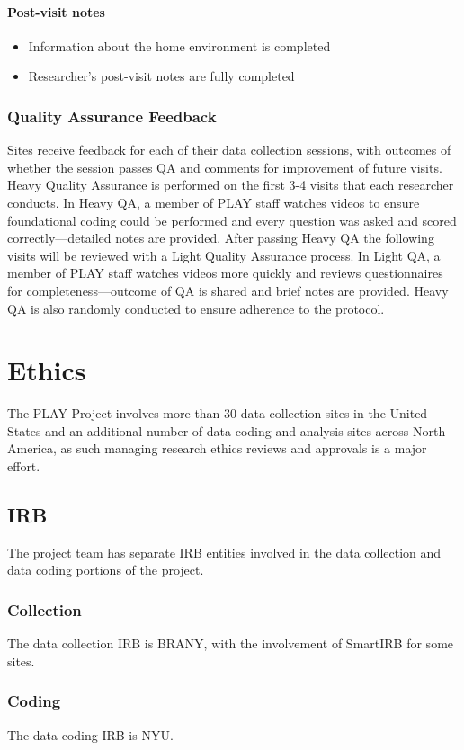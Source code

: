 \documentclass[
]{book}
\providecommand{\tightlist}{%
  \setlength{\itemsep}{0pt}\setlength{\parskip}{0pt}}
\begin{document}
\hypertarget{post-visit-notes}{%
\subsection{Post-visit notes}\label{post-visit-notes}}

\begin{itemize}
\tightlist
\item
  Information about the home environment is completed
\item
  Researcher's post-visit notes are fully completed
\end{itemize}

\hypertarget{quality-assurance-feedback}{%
\section{Quality Assurance Feedback}\label{quality-assurance-feedback}}

Sites receive feedback for each of their data collection sessions, with outcomes of whether the session passes QA and comments for improvement of future visits. Heavy Quality Assurance is performed on the first 3-4 visits that each researcher conducts. In Heavy QA, a member of PLAY staff watches videos to ensure foundational coding could be performed and every question was asked and scored correctly---detailed notes are provided. After passing Heavy QA the following visits will be reviewed with a Light Quality Assurance process. In Light QA, a member of PLAY staff watches videos more quickly and reviews questionnaires for completeness---outcome of QA is shared and brief notes are provided. Heavy QA is also randomly conducted to ensure adherence to the protocol.

\hypertarget{part-ethics}{%
\part{Ethics}\label{part-ethics}}

The PLAY Project involves more than 30 data collection sites in the United States and an additional number of data coding and analysis sites across North America, as such managing research ethics reviews and approvals is a major effort.

\hypertarget{irb}{%
\chapter{IRB}\label{irb}}

The project team has separate IRB entities involved in the data collection and data coding portions of the project.

\hypertarget{collection}{%
\section{Collection}\label{collection}}

The data collection IRB is BRANY, with the involvement of SmartIRB for some sites.

\hypertarget{coding}{%
\section{Coding}\label{coding}}

The data coding IRB is NYU.

  
\end{document}
